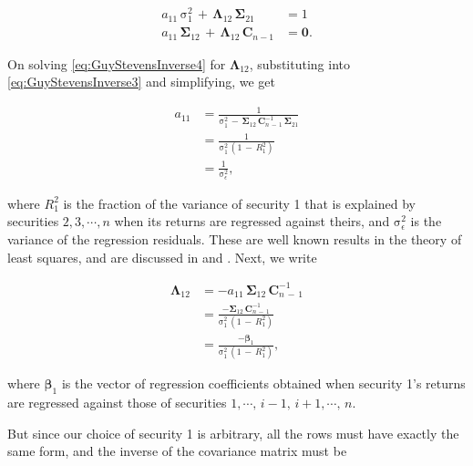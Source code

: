 \documentclass[graybox,envcountchap,sectrefs]{svmono}\usepackage[]{graphicx}\usepackage[]{xcolor}
\begin{document}
\begin{appendices}
\begin{subequations}
\begin{align}
a_{11}\,\mathrm{\sigma}_{1}^{2}\,+\,\mathbf{\Lambda}_{12}\,\mathbf{\Sigma}_{21} & =1\label{eq:GuyStevensInverse3}\\[0.5em]
a_{11}\,\mathbf{\Sigma}_{12}\,+\,\mathbf{\Lambda}_{12}\,\mathrm{\mathbf{C}}_{n-1} & =\mathbf{0}.\label{eq:GuyStevensInverse4}
\end{align}
\end{subequations}

On solving \eqref{eq:GuyStevensInverse4} for $\mathbf{\Lambda}_{12}$,
substituting into \eqref{eq:GuyStevensInverse3} and simplifying,
we get

\begin{align}
a_{11} & =\frac{1}{\mathrm{\sigma}_{1}^{2}\,-\,\mathbf{\Sigma}_{12}\,\mathrm{\mathbf{C}}_{n\,-\,1}^{-1}\,\mathbf{\Sigma}_{21}}\nonumber \\
 & =\frac{1}{\mathrm{\sigma}_{1}^{2}\,\left(1\,-\,R_{1}^{2}\right)}\nonumber \\
 & =\frac{1}{\mathrm{\sigma}_{\epsilon}^{2}},\label{eq:GuyStevensA11}
\end{align}

where $R_{1}^{2}$ is the fraction of the variance of security 1 that
is explained by securities $2,3,\cdots,n$ when its returns are regressed
against theirs, and $\mathrm{\sigma}_{\epsilon}^{2}$ is the variance
of the regression residuals. These are well known results in the theory
of least squares, and are discussed in \citet{Stevens1997} and \citet{Hayashi2000}.
Next, we write

\begin{align}
\mathbf{\Lambda}_{12} & =-a_{11}\,\mathbf{\Sigma}_{12}\,\mathrm{\mathbf{C}}_{n\,-\,1}^{-1}\nonumber \\
 & =\frac{-\mathbf{\Sigma}_{12}\,\mathrm{\mathbf{C}}_{n\,-\,1}^{-1}}{\mathrm{\sigma}_{1}^{2}\,\left(1\,-\,R_{1}^{2}\right)}\nonumber \\
 & =\frac{-\mathrm{\boldsymbol{\beta}_{1}}}{\mathrm{\sigma}_{1}^{2}\,\left(1\,-\,R_{1}^{2}\right)},\label{eq:GuyStevensBeta1}
\end{align}

where $\boldsymbol{\beta}_{1}$ is the vector of regression coefficients
obtained when security 1's returns are regressed against those of
securities $1,\cdots,\,i-1,\,i+1,\cdots,\,n$. 

But since our choice of security 1 is arbitrary, all the rows must
have exactly the same form, and the inverse of the covariance matrix
must be


\end{appendices}
\end{document}
